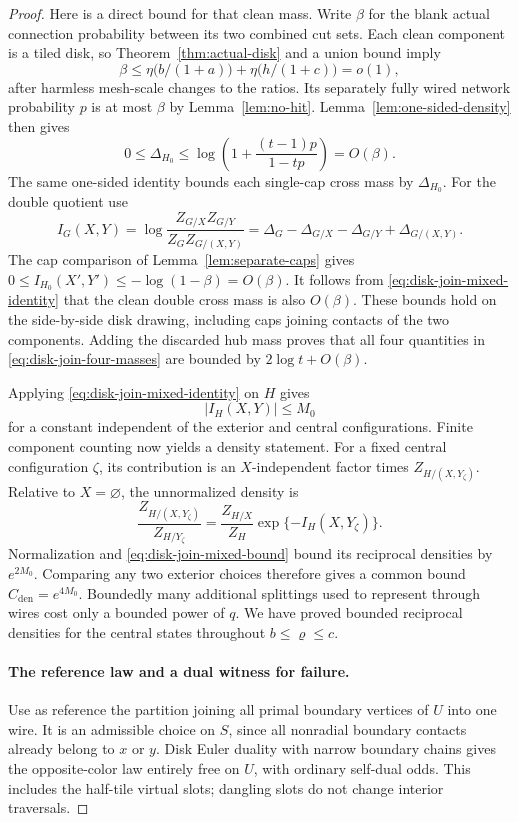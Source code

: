 \begin{proof}
Here is a direct bound for that clean mass.  Write $\beta$ for the blank
actual connection probability between its two combined cut sets.
Each clean component is a tiled disk, so Theorem~\ref{thm:actual-disk}
and a union bound imply
\[
 \beta\le \eta\bigl(b/(1+a)\bigr)+\eta\bigl(h/(1+c)\bigr)=o(1),
\]
after harmless mesh-scale changes to the ratios.  Its separately
fully wired network probability $p$ is at most $\beta$ by
Lemma~\ref{lem:no-hit}.  Lemma~\ref{lem:one-sided-density} then gives
\[
 0\le\Delta_{H_0}\le
 \log\left(1+\frac{(t-1)p}{1-tp}\right)=O(\beta).
\]
The same one-sided identity bounds each single-cap cross mass by
$\Delta_{H_0}$.  For the double quotient use
\begin{equation}\label{eq:disk-join-mixed-identity}
 I_G(X,Y)=\log\frac{Z_{G/X}Z_{G/Y}}{Z_G Z_{G/(X,Y)}}
 =\Delta_G-\Delta_{G/X}-\Delta_{G/Y}+\Delta_{G/(X,Y)}.
\end{equation}
The cap comparison of Lemma~\ref{lem:separate-caps} gives
$0\le I_{H_0}(X',Y')\le-\log(1-\beta)=O(\beta)$.
It follows from \eqref{eq:disk-join-mixed-identity} that the clean double
cross mass is also $O(\beta)$.  These bounds hold on the side-by-side
disk drawing, including caps joining contacts of the two components.
Adding the discarded hub mass proves that all four quantities in
\eqref{eq:disk-join-four-masses} are bounded by
$2\log t+O(\beta)$.

Applying \eqref{eq:disk-join-mixed-identity} on $H$ gives
\begin{equation}\label{eq:disk-join-mixed-bound}
 |I_H(X,Y)|\le M_0
\end{equation}
for a constant independent of the exterior and central configurations.
Finite component counting now yields a density statement.  For a fixed
central configuration $\zeta$, its contribution is an $X$-independent
factor times $Z_{H/(X,Y_\zeta)}$.  Relative to $X=\varnothing$, the
unnormalized density is
\[
 \frac{Z_{H/(X,Y_\zeta)}}{Z_{H/Y_\zeta}}
   =\frac{Z_{H/X}}{Z_H}\exp\{-I_H(X,Y_\zeta)\}.
\]
Normalization and \eqref{eq:disk-join-mixed-bound} bound its reciprocal
densities by $e^{2M_0}$.  Comparing any two exterior choices therefore
gives a common bound $C_{\mathrm{den}}=e^{4M_0}$.  Boundedly many
additional splittings used to represent through wires cost only a
bounded power of $q$.  We have proved bounded reciprocal densities for
the central states throughout $b\le\varrho\le c$.

\paragraph{The reference law and a dual witness for failure.}
Use as reference the partition joining all primal boundary vertices
of $U$ into one wire.  It is an admissible choice on $S$, since all
nonradial boundary contacts already belong to $x$ or $y$.  Disk Euler
duality with narrow boundary chains gives the opposite-color law
entirely free on $U$, with ordinary self-dual odds.  This includes the
half-tile virtual slots; dangling slots do not change interior
traversals.


\end{proof}
